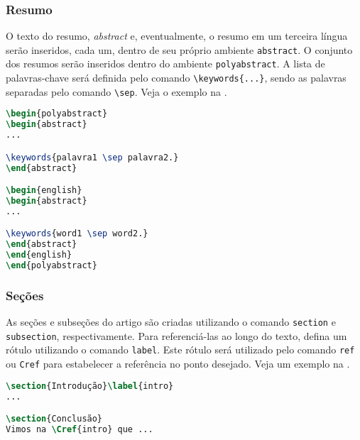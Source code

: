 \documentclass{textolivre}
\begin{document}
\subsubsection{Resumo}\label{sec-resumo}
O texto do resumo, \emph{abstract} e, eventualmente, o resumo em um terceira língua serão inseridos, cada um, 
dentro de seu próprio ambiente \verb|abstract|. O conjunto dos resumos serão inseridos dentro do ambiente \verb|polyabstract|.
A lista de palavras-chave será definida pelo comando \verb|\keywords{...}|, sendo as palavras separadas pelo
comando \verb|\sep|. Veja o exemplo na .
\begin{lstlisting}[language=tex, label=lst-abstract, caption={Como definir os resumos e palavras chaves em várias línguas.}]
\begin{polyabstract}
\begin{abstract}
...

\keywords{palavra1 \sep palavra2.}
\end{abstract}

\begin{english}
\begin{abstract}
...

\keywords{word1 \sep word2.}
\end{abstract}
\end{english}
\end{polyabstract}
\end{lstlisting} %


\subsubsection{Seções}\label{sec-secoes}
As seções e subseções do artigo são criadas utilizando o comando \verb|section|
e \verb|subsection|, respectivamente. Para referenciá-las ao longo do texto,
defina um rótulo utilizando o comando \verb|label|. Este rótulo será utilizado 
pelo comando \verb|ref| ou \verb|Cref| para estabelecer a referência no ponto desejado.
Veja um exemplo na .
\begin{lstlisting}[language=tex, label=lst-seclbl, caption={Seções, subseções e referências.}]
\section{Introdução}\label{intro}
...

\section{Conclusão}
Vimos na \Cref{intro} que ...
\end{lstlisting} %
\end{document}
